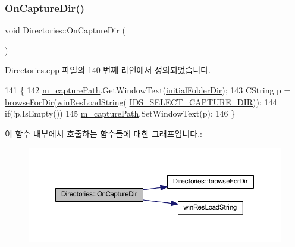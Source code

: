 \subsubsection{\texorpdfstring{On\+Capture\+Dir()}{OnCaptureDir()}}
{\footnotesize\ttfamily void Directories\+::\+On\+Capture\+Dir (\begin{DoxyParamCaption}{ }\end{DoxyParamCaption})\hspace{0.3cm}{\ttfamily [protected]}}



Directories.\+cpp 파일의 140 번째 라인에서 정의되었습니다.


\begin{DoxyCode}
141 \{
142   \mbox{\hyperlink{class_directories_a4010cf261f54e1477c6587395fd055d4}{m\_capturePath}}.GetWindowText(\mbox{\hyperlink{class_directories_a5f307fd959af44c194c520b5452cafba}{initialFolderDir}});
143   CString p = \mbox{\hyperlink{class_directories_a7e24bf265fe6af9c01e0939952c337e1}{browseForDir}}(\mbox{\hyperlink{_win_res_util_8cpp_a416e85e80ab9b01376e87251c83d1a5a}{winResLoadString}}(
      \mbox{\hyperlink{resource_8h_a2fcd6aabce9d74f1133d5c84914aaa16}{IDS\_SELECT\_CAPTURE\_DIR}}));
144   \textcolor{keywordflow}{if}(!p.IsEmpty())
145     \mbox{\hyperlink{class_directories_a4010cf261f54e1477c6587395fd055d4}{m\_capturePath}}.SetWindowText(p);
146 \}
\end{DoxyCode}
이 함수 내부에서 호출하는 함수들에 대한 그래프입니다.\+:
\nopagebreak
\begin{figure}[H]
\begin{center}
\leavevmode
\includegraphics[width=350pt]{class_directories_a01d34b2ff1d1c0a2a3e638e0cfdd7db7_cgraph}
\end{center}
\end{figure}
\mbox{\label{class_directories_a2e98e0696392fcd819f48ac56012c35d}} 
